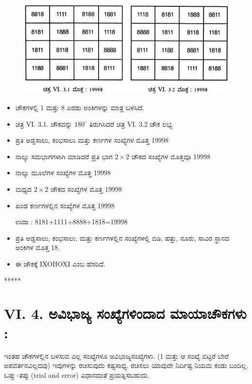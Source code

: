 \begin{figure}[H]
\includegraphics{src/figures/chap5/fig5-3.jpg}
\end{figure}
\begin{itemize}
	\item ಚೌಕಗಳಲ್ಲಿ 1 ಮತ್ತು 8 ಎರಡು ಅಂಕಿಗಳನ್ನು ಮಾತ್ರ ಬಳಸಿದೆ.
	\item ಚಿತ್ರ VI. 3.1. ಚೌಕವನ್ನು $180^\circ$ ತಿರುಗಿಸಿದರೆ ಚಿತ್ರ VI. 3.2 ಚೌಕ ಲಭ್ಯ
	\item ಪ್ರತಿ ಅಡ್ಡಸಾಲು, ಕಂಭಸಾಲು ಮತ್ತು ಕರ್ಣಗಳ ಸಂಖ್ಯೆಗಳ ಮೊತ್ತ 19998
	\item ನಾಲ್ಕು ಸಮಭಾಗಗಳಾಗಿ ಮಾಡಿದರೆ ಪ್ರತಿ ಭಾಗ $2 \times 2$ ಚೌಕದ ಸಂಖ್ಯೆಗಳ ಮೊತ್ತವೂ 19998
	\item ನಾಲ್ಕು ಮೂಲೆಗಳ ಸಂಖ್ಯೆಗಳ ಮೊತ್ತ 19998
	\item ಮಧ್ಯದ $2 \times 2$ ಚೌಕದ ಸಂಖ್ಯೆಗಳ ಮೊತ್ತ 19998
	\item ಖಂಡ ಕರ್ಣಗಳಲ್ಲಿನ ಸಂಖ್ಯೆಗಳ ಮೊತ್ತ 19998

	ಉದಾ : 8181+1111+8888+1818=19998
	\item ಪ್ರತಿ ಅಡ್ಡಸಾಲು, ಕಂಭಸಾಲು, ಮತ್ತು ಕರ್ಣಗಳಲ್ಲಿನ ಸಂಖ್ಯೆಗಳಲ್ಲಿ ಬಿಡಿ, ಹತ್ತು, ನೂರು, ಸಾವಿರ ಸ್ಥಾನದ ಅಂಕಿಗಳ ಮೊತ್ತ 18.
	\item ಈ ಚೌಕಕ್ಕೆ IXOHOXI ಎಂಬ ಹೆಸರಿದೆ.
\end{itemize}
\begin{center}
*****
\end{center}

\section*{VI. 4. ಅವಿಭಾಜ್ಯ ಸಂಖ್ಯೆಗಳಿಂದಾದ ಮಾಯಾಚೌಕಗಳು :}

ಇಂತಹ ಚೌಕಗಳಲ್ಲಿನ ಬಳಸುವ ಎಲ್ಲ ಸಂಖ್ಯೆಗಳೂ ಅವಿಭಾಜ್ಯಸಂಖ್ಯೆಗಳು. (1 ಮತ್ತು ಆ ಸಂಖ್ಯೆ ಬಿಟ್ಟರೆ ಬೇರೆ ಅಪವರ್ತನವಿಲ್ಲದವು) ಇವುಗಳನ್ನು ರಚಿಸುವುದು ಕಷ್ಟಸಾಧ್ಯ. ರಚಿಸಲು ಯಾವುದೇ ನಿರ್ದಿಷ್ಟ ನಿಯಮ ಕಂಡು ಬಂದಿಲ್ಲ. ಒಪ್ಪು -ತಪ್ಪು (trial and error) ವಿಧಾನದಂತೆ ಪ್ರಯತ್ನಿಸಬಹುದು.

